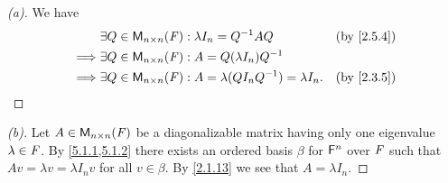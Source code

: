 \begin{proof}[(a)]
	We have
	\begin{align*}
		         & \exists Q \in \ms[n][n][\F] : \lambda I_n = Q^{-1} A Q                  &  & \by{2.5.4} \\
		\implies & \exists Q \in \ms[n][n][\F] : A = Q (\lambda I_n) Q^{-1}                                \\
		\implies & \exists Q \in \ms[n][n][\F] : A = \lambda (Q I_n Q^{-1}) = \lambda I_n. &  & \by{2.3.5}
	\end{align*}
\end{proof}

\begin{proof}[(b)]
	Let \(A \in \ms[n][n][\F]\) be a diagonalizable matrix having only one eigenvalue \(\lambda \in \mathit{F}\).
	By \cref{5.1.1,5.1.2} there exists an ordered basis \(\beta\) for \(\mathsf{F}^n\) over \(\mathit{F}\) such that \(Av = \lambda v = \lambda I_n v\) for all \(v \in \beta\).
	By \cref{2.1.13} we see that \(A = \lambda I_n\).
\end{proof}

